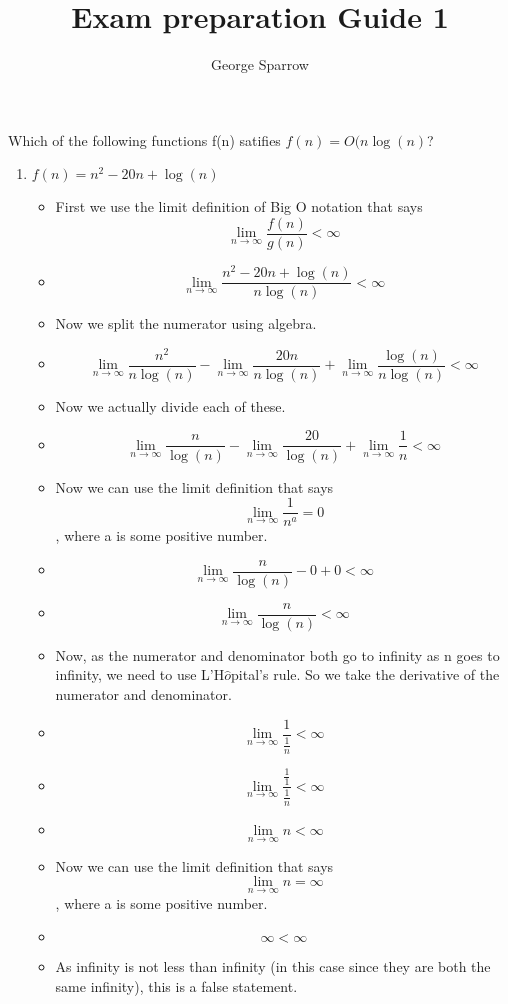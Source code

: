 \documentclass{article}
\title{Exam preparation Guide 1}
\date{\mydate}
\author{George Sparrow}
\begin{document}
\maketitle
\newpage

Which of the following functions f(n) satifies $f(n)=O(n\log{(n)}$?
\begin{enumerate}
\item $f(n) = n^{2}-20n+\log{(n)}$
  \begin{itemize}
  \item First we use the limit definition of Big O notation that says $$\lim_{n \to \infty} \frac{f(n)}{g(n)} < \infty$$
  \item {\large $$\lim_{n \to \infty} \frac{n^{2}-20n+\log{(n)}}{n\log{(n)}} < \infty$$}
  \item Now we split the numerator using algebra.
  \item {\large $$\lim_{n \to \infty} \frac{n^{2}}{n\log{(n)}} - \lim_{n \to \infty} \frac{20n}{n\log{(n)}} +\lim_{n \to \infty} \frac{\log{(n)}}{n\log{(n)}} < \infty$$}
  \item Now we actually divide each of these.
  \item {\large $$\lim_{n \to \infty} \frac{n}{\log{(n)}} - \lim_{n \to \infty} \frac{20}{\log{(n)}} +\lim_{n \to \infty} \frac{1}{n} < \infty$$}
  \item Now we can use the limit definition that says $$\lim_{n \to \infty} \frac{1}{n^{a}} = 0$$, where a is some positive number.
  \item {\large $$\lim_{n \to \infty} \frac{n}{\log{(n)}} -0+0 < \infty$$}
  \item {\large $$\lim_{n \to \infty} \frac{n}{\log{(n)}} < \infty$$}
  \item Now, as the numerator and denominator both go to infinity as n goes to infinity, we need to use L'H$\hat{o}$pital's rule. So we take the derivative of the numerator and denominator.
  \item {\large $$\lim_{n \to \infty} \frac{1}{\frac{1}{n}} < \infty$$}
  \item {\large $$\lim_{n \to \infty} \frac{\frac{1}{1}}{\frac{1}{n}} < \infty$$}
  \item {\large $$\lim_{n \to \infty} n < \infty$$}
  \item Now we can use the limit definition that says $$\lim_{n \to \infty} n = \infty$$, where a is some positive number.
  \item {\large $$\infty < \infty$$}
  \item As infinity is not less than infinity (in this case since they are both the same infinity), this is a false statement.

\end{itemize}
\end{enumerate}
\end{document}
